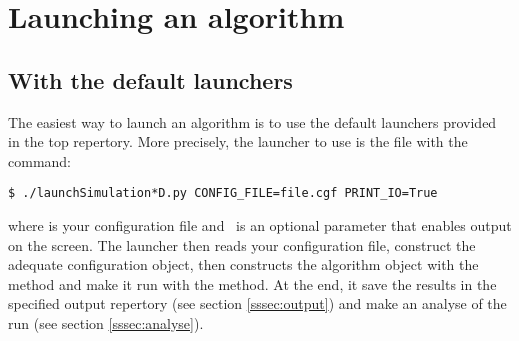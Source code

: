 
\section{Launching an algorithm\label{ssec:launch-algo}}
\noindent

    \subsection{With the default launchers}
    \noindent

        The easiest way to launch an algorithm is to use the default launchers provided in the top repertory.
        More precisely, the launcher to use is the \python file  with the command:
        \lstset{style=codebash}
        \begin{lstlisting}
$ ./launchSimulation*D.py CONFIG_FILE=file.cgf PRINT_IO=True\end{lstlisting}
        where  is
        your configuration file and  is an optional parameter that enables output on the screen.
        The launcher then reads your configuration file, construct the adequate configuration object, then constructs
        the algorithm object with the  method and make it run with the  method.
        At the end, it save the results in the specified output repertory (see section \ref{sssec:output}) and make an analyse of the
        run (see section \ref{sssec:analyse}).\\

